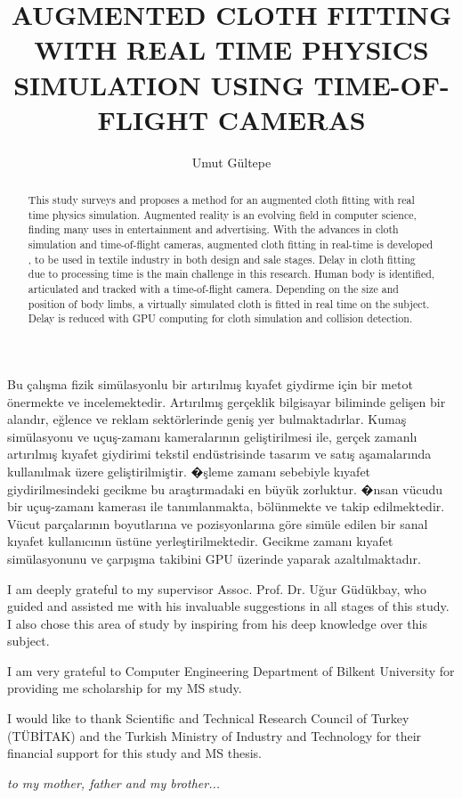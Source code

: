 \documentclass{buthesis}
\title{AUGMENTED CLOTH FITTING WITH REAL TIME PHYSICS SIMULATION USING TIME-OF-FLIGHT CAMERAS}
\author{Umut G{\"u}ltepe}
\begin{document}
\titlepageMS
\signaturepageMS
\begin{abstract}
\indent This study surveys and proposes a method for an augmented cloth fitting with real time physics simulation. Augmented reality is an evolving field in computer science, finding many uses in entertainment and advertising. With the advances in cloth simulation and time-of-flight cameras, augmented cloth fitting in real-time is developed , to be used in textile industry in both design and sale stages. Delay in cloth fitting due to processing time is the main challenge in this research. Human body is identified, articulated and tracked with a time-of-flight camera. Depending on the size and position of body limbs, a virtually simulated cloth is fitted in real time on the subject. Delay is reduced with GPU computing for cloth simulation and collision detection.
\end{abstract}



\begin{ozet}
\indent Bu \c{c}al{\i}\c{s}ma fizik sim{\"u}lasyonlu bir art{\i}r{\i}lm{\i}\c{s} k{\i}yafet giydirme i\c{c}in bir metot {\"o}nermekte ve incelemektedir. Art{\i}r{\i}lm{\i}\c{s} ger\c{c}eklik bilgisayar biliminde geli\c{s}en bir aland{\i}r, e\u{g}lence ve reklam sekt{\"o}rlerinde geni\c{s} yer bulmaktad{\i}rlar. Kuma\c{s} sim{\"u}lasyonu ve u\c{c}u\c{s}-zaman{\i} kameralar{\i}n{\i}n geli\c{s}tirilmesi ile, ger\c{c}ek zamanl{\i} art{\i}r{\i}lm{\i}\c{s} k{\i}yafet giydirimi tekstil end{\"u}strisinde tasar{\i}m ve sat{\i}\c{s} a\c{s}amalar{\i}nda kullan{\i}lmak {\"u}zere geli\c{s}tirilmi\c{s}tir. �\c{s}leme zaman{\i} sebebiyle k{\i}yafet giydirilmesindeki gecikme bu ara\c{s}t{\i}rmadaki en b{\"u}y{\"u}k zorluktur. �nsan v{\"u}cudu bir u\c{c}u\c{s}-zaman{\i} kameras{\i} ile tan{\i}mlanmakta, b{\"o}l{\"u}nmekte ve takip edilmektedir. V{\"u}cut par\c{c}alar{\i}n{\i}n boyutlar{\i}na ve pozisyonlar{\i}na g{\"o}re sim{\"u}le edilen bir sanal k{\i}yafet kullan{\i}c{\i}n{\i}n {\"u}st{\"u}ne yerle\c{s}tirilmektedir. Gecikme zaman{\i} k{\i}yafet sim{\"u}lasyonunu ve \c{c}arp{\i}\c{s}ma takibini GPU {\"u}zerinde yaparak azalt{\i}lmaktad{\i}r.  
\end{ozet}

\begin{ack}

I am deeply grateful to my supervisor Assoc. Prof. Dr. U\u{g}ur G{\"u}d{\"u}kbay, who guided and assisted me with his invaluable suggestions in all stages of this study. I also chose this area of study by inspiring from his deep knowledge over this subject.

I am very grateful to Computer Engineering Department of Bilkent University for providing me scholarship for my MS study. 

I would like to thank Scientific and Technical Research Council of Turkey (T{\"U}B\.{I}TAK) and the Turkish Ministry of Industry and Technology for their financial support for this study and MS thesis.

\end{ack}

\newpage
\setcounter{page}{5}
\vspace*{5cm}
\begin{center}
{\large \it to my mother, father and my brother...}
\end{center}

\tableofcontents
\listoffigures
\listoftables
\listofalgorithms
\newpage
\newpage
%
\newpage
\pagestyle{headings}
\makeatother
\end{document}
